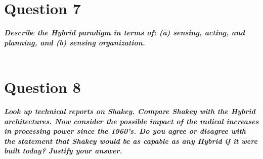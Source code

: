\documentclass{article}
\newcommand\tab[1][1cm]{\hspace*{#1}}
\begin{document}
\section*{Question 7}
\textbf{\textit{
    \tab Describe the Hybrid paradigm in terms of: (a) sensing, acting, and planning, and (b) sensing organization.
}} \\ \\
\section*{Question 8}
\textbf{\textit{
    \tab Look up technical reports on Shakey. Compare Shakey with the Hybrid architectures.  Now  consider  the  possible  impact  of the  radical  increases  in processing power since the 1960’s. Do you agree or disagree with the statement that Shakey would be as capable as any Hybrid if it were built today? Justify your answer.
}} \\ \\
\end{document}
